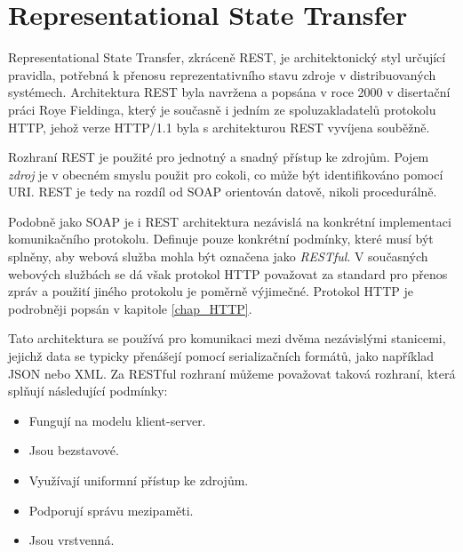
\section{Representational State Transfer}
\label{sec_REST}

Representational State Transfer, zkráceně REST, je architektonický styl určující pravidla, potřebná k přenosu reprezentativního stavu zdroje v distribuovaných systémech. Architektura REST byla navržena a popsána v roce 2000 v disertační práci \cite{Roy} Roye Fieldinga, který je současně i jedním ze spoluzakladatelů protokolu HTTP, jehož verze HTTP/1.1 byla s architekturou REST vyvíjena souběžně.

Rozhraní REST je použité pro jednotný a snadný přístup ke zdrojům. Pojem \textit{zdroj} je v obecném smyslu použit pro cokoli, co může být identifikováno pomocí URI. REST je tedy na rozdíl od SOAP orientován datově, nikoli procedurálně. 

Podobně jako SOAP je i REST architektura nezávislá na konkrétní implementaci komunikačního protokolu. Definuje pouze konkrétní podmínky, které musí být splněny, aby webová služba mohla být označena jako \textit{RESTful}. V současných webových službách se dá však protokol HTTP považovat za standard pro přenos zpráv a použití jiného protokolu je poměrně výjimečné. Protokol HTTP je podrobněji popsán v kapitole \ref{chap_HTTP}. 

Tato architektura se používá pro komunikaci mezi dvěma nezávislými stanicemi, jejichž data se typicky přenášejí pomocí serializačních formátů, jako například JSON nebo XML. Za RESTful rozhraní můžeme považovat taková rozhraní, která splňují následující podmínky:\cite{Schmidl} 
\begin{itemize}
  \item Fungují na modelu klient-server.
  \item Jsou bezstavové.
  \item Využívají uniformní přístup ke zdrojům.
  \item Podporují správu mezipaměti.
  \item Jsou vrstvenná.
\end{itemize}


